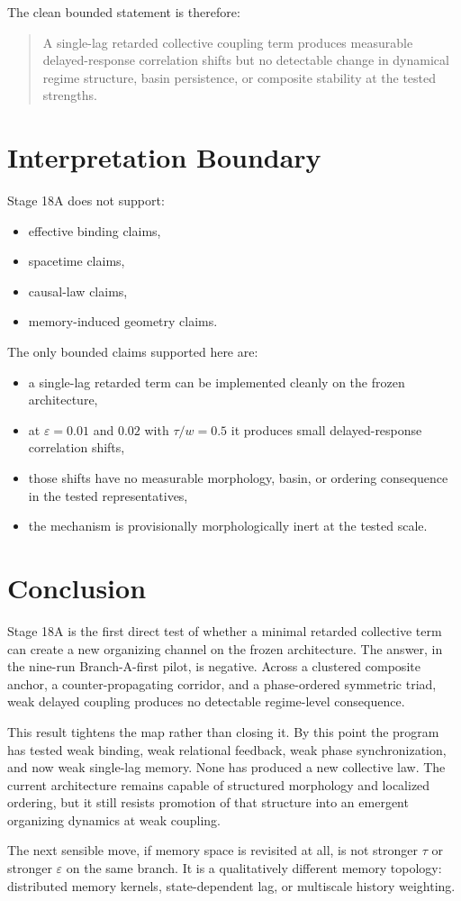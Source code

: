 \documentclass[11pt]{article}
\begin{document}
The clean bounded statement is therefore:

\begin{quote}
A single-lag retarded collective coupling term produces measurable delayed-response correlation shifts but no detectable change in dynamical regime structure, basin persistence, or composite stability at the tested strengths.
\end{quote}

\section{Interpretation Boundary}

Stage 18A does not support:
\begin{itemize}
\item effective binding claims,
\item spacetime claims,
\item causal-law claims,
\item memory-induced geometry claims.
\end{itemize}

The only bounded claims supported here are:
\begin{itemize}
\item a single-lag retarded term can be implemented cleanly on the frozen architecture,
\item at $\varepsilon=0.01$ and $0.02$ with $\tau / w = 0.5$ it produces small delayed-response correlation shifts,
\item those shifts have no measurable morphology, basin, or ordering consequence in the tested representatives,
\item the mechanism is provisionally morphologically inert at the tested scale.
\end{itemize}

\section{Conclusion}

Stage 18A is the first direct test of whether a minimal retarded collective term can create a new organizing channel on the frozen architecture. The answer, in the nine-run Branch-A-first pilot, is negative. Across a clustered composite anchor, a counter-propagating corridor, and a phase-ordered symmetric triad, weak delayed coupling produces no detectable regime-level consequence.

This result tightens the map rather than closing it. By this point the program has tested weak binding, weak relational feedback, weak phase synchronization, and now weak single-lag memory. None has produced a new collective law. The current architecture remains capable of structured morphology and localized ordering, but it still resists promotion of that structure into an emergent organizing dynamics at weak coupling.

The next sensible move, if memory space is revisited at all, is not stronger $\tau$ or stronger $\varepsilon$ on the same branch. It is a qualitatively different memory topology: distributed memory kernels, state-dependent lag, or multiscale history weighting.
\end{document}
